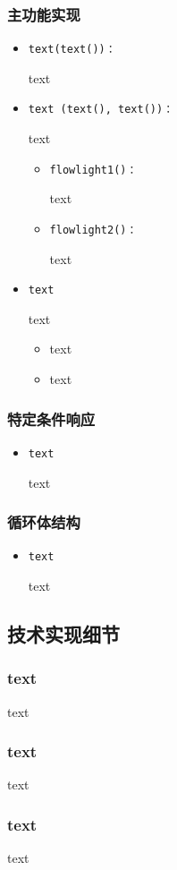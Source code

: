 \subsubsection{主功能实现}
\begin{itemize}
    \item \begin{verbatim}text(text())：\end{verbatim}text
    \item \begin{verbatim}text (text(), text())：\end{verbatim}text
          \begin{itemize}
              \item \begin{verbatim}flowlight1()：\end{verbatim}text
              \item \begin{verbatim}flowlight2()：\end{verbatim}text
          \end{itemize}
    \item \begin{verbatim}text\end{verbatim}
          text
          \begin{itemize}
              \item text
              \item text
          \end{itemize}

\end{itemize}


\subsubsection{特定条件响应}
\begin{itemize}
    \item \begin{verbatim}text\end{verbatim}text
\end{itemize}


\subsubsection{循环体结构}
\begin{itemize}
    \item \begin{verbatim}text\end{verbatim}text
\end{itemize}

\subsection{技术实现细节}
\subsubsection{text}
text
\subsubsection{text}
text
\subsubsection{text}
text
